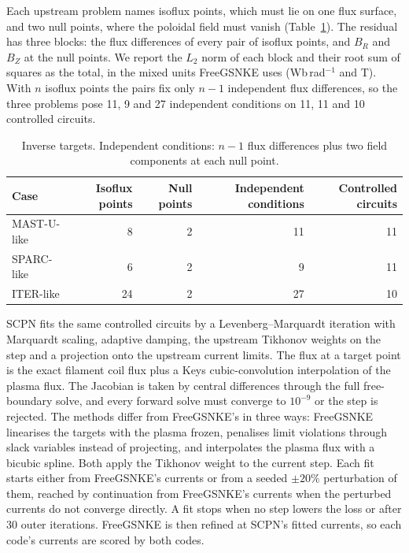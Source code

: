 \documentclass[11pt]{article}
\begin{document}
Each upstream problem names isoflux points, which must lie on one flux surface,
and two null points, where the poloidal field must vanish
(Table~\ref{tab:targets}).  The residual has three blocks: the flux
differences of every pair of isoflux points, and $B_R$ and $B_Z$ at the null
points.  We report the $L_2$ norm of each block and their root sum of squares
as the total, in the mixed units FreeGSNKE uses (Wb\,rad$^{-1}$ and T).  With
$n$ isoflux points the pairs fix only $n-1$ independent flux differences, so
the three problems pose 11, 9 and 27 independent conditions on 11, 11 and 10
controlled circuits.

\begin{table}[ht]
\centering
\caption{Inverse targets.  Independent conditions: $n-1$ flux differences plus
two field components at each null point.}
\label{tab:targets}
\begin{tabular}{lrrrr}
\toprule
Case & Isoflux points & Null points & Independent conditions & Controlled circuits \\
\midrule
MAST-U-like & 8 & 2 & 11 & 11 \\
SPARC-like & 6 & 2 & 9 & 11 \\
ITER-like & 24 & 2 & 27 & 10 \\
\bottomrule
\end{tabular}
\end{table}

SCPN fits the same controlled circuits by a Levenberg--Marquardt iteration
\citep{Levenberg1944,Marquardt1963} with Marquardt scaling, adaptive damping, the
upstream Tikhonov weights on the step and a projection onto the upstream current
limits.  The flux at a target point is the exact filament coil flux plus a Keys
cubic-convolution interpolation \citep{Keys1981} of the plasma flux.  The
Jacobian is taken by central differences through the full free-boundary solve,
and every forward solve must converge to $10^{-9}$ or the step is rejected.  The
methods differ from FreeGSNKE's in three ways: FreeGSNKE linearises the targets
with the plasma frozen, penalises limit violations through slack variables
instead of projecting, and interpolates the plasma flux with a bicubic spline.
Both apply the Tikhonov weight to the current step.  Each fit starts either
from FreeGSNKE's currents or from a seeded $\pm 20\%$ perturbation of them,
reached by continuation from FreeGSNKE's currents when the perturbed currents do
not converge directly.  A fit stops when no step lowers the loss or after 30
outer iterations.  FreeGSNKE is then refined at SCPN's fitted currents, so each
code's currents are scored by both codes.
\end{document}
